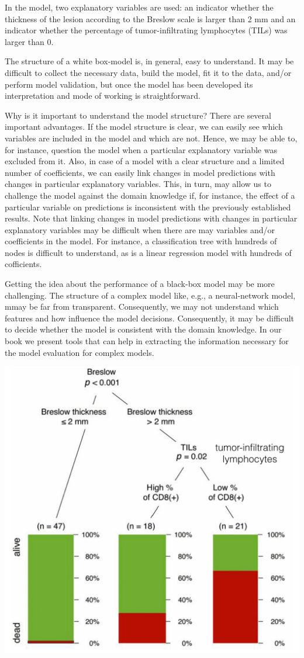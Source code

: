 \documentclass[]{krantz}
\theoremstyle{definition}
\theoremstyle{definition}
\theoremstyle{definition}
\theoremstyle{remark}
\begin{document}
In the model, two explanatory variables are used: an indicator whether
the thickness of the lesion according to the Breslow scale is larger
than 2 mm and an indicator whether the percentage of tumor-infiltrating
lymphocytes (TILs) was larger than 0.

The structure of a white box-model is, in general, easy to understand.
It may be difficult to collect the necessary data, build the model, fit
it to the data, and/or perform model validation, but once the model has
been developed its interpretation and mode of working is
straightforward.

Why is it important to understand the model structure? There are several
important advantages. If the model structure is clear, we can easily see
which variables are included in the model and which are not. Hence, we
may be able to, for instance, question the model when a particular
explanatory variable was excluded from it. Also, in case of a model with
a clear structure and a limited number of coefficients, we can easily
link changes in model predictions with changes in particular explanatory
variables. This, in turn, may allow us to challenge the model against
the domain knowledge if, for instance, the effect of a particular
variable on predictions is inconsistent with the previously established
results. Note that linking changes in model predictions with changes in
particular explanatory variables may be difficult when there are may
variables and/or coefficients in the model. For instance, a
classification tree with hundreds of nodes is difficult to understand,
as is a linear regression model with hundreds of cofficients.

Getting the idea about the performance of a black-box model may be more
challenging. The structure of a complex model like, e.g., a
neural-network model, mmay be far from transparent. Consequently, we may
not understand which features and how influence the model decisions.
Consequently, it may be difficult to decide whether the model is
consistent with the domain knowledge. In our book we present tools that
can help in extracting the information necessary for the model
evaluation for complex models.

\begin{center}\includegraphics[width=0.5\linewidth]{figure/wbBILL8model} \end{center}
\end{document}
